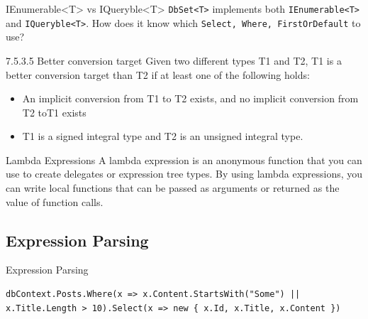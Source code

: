 \documentclass{bredelebeamer}
\begin{document}
\begin{frame}{IEnumerable<T> vs IQueryble<T>}
    \lstinline{DbSet<T>} implements both \lstinline{IEnumerable<T>} and \lstinline{IQueryble<T>}.
    How does it know which \lstinline{Select, Where, FirstOrDefault} to use?
    \pause
    \begin{block}{7.5.3.5 Better conversion target}
        Given two different types T1 and T2, T1 is a better conversion target than T2 if at least one of the following holds:
        \begin{itemize}
            \item An implicit conversion from T1 to T2 exists, and no implicit conversion from T2 toT1 exists
            \item T1 is a signed integral type and T2 is an unsigned integral type.
        \end{itemize}
    \end{block}
    \begin{exampleblock}{Lambda Expressions}
        A lambda expression is an anonymous function that you can use to create delegates or expression tree types. By using lambda expressions, you can write local functions that can be passed as arguments or returned as the value of function calls.
    \end{exampleblock}
\end{frame}
\subsection{Expression Parsing}
\begin{frame}[fragile]{Expression Parsing}
    \begin{lstlisting}
dbContext.Posts.Where(x => x.Content.StartsWith("Some") || x.Title.Length > 10).Select(x => new { x.Id, x.Title, x.Content })
    \end{lstlisting}
    \pause
    
\end{frame}
\end{document}
